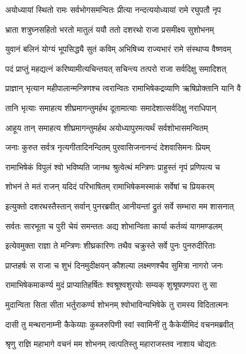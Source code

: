 \twolineshloka
{अयोध्यायां स्थितो रामः सर्वभोगसमन्वितः}
{प्रीत्या नन्दत्ययोध्यायां रामे रघुपतौ नृप} %

\twolineshloka
{भ्राता शत्रुघ्नसहितो भरतो मातुलं ययौ}
{ततो दशरथो राजा प्रसमीक्ष्य सुशोभनम्} %

\twolineshloka
{युवानं बलिनं योग्यं भूपसिद्ध्यै सुतं कविम्}
{अभिषिच्य राज्यभारं रामे संस्थाप्य वैष्णवम्} %

\twolineshloka
{पदं प्राप्तुं महद्यत्नं करिष्यामीत्यचिन्तयत्}
{सचिन्त्य तत्परो राजा सर्वदिक्षु समादिशत्} %

\twolineshloka
{प्राज्ञान् भृत्यान महीपालान्मन्त्रिणश्च त्वरान्वितः}
{रामाभिषेकद्रव्याणि ऋषिप्रोक्तानि यानि वै} %

\twolineshloka
{तानि भृत्याः समाहत्य शीघ्रमागन्तुमर्हथ}
{दूतामात्याः समादेशात्सर्वदिक्षु नराधिपान्} %

\twolineshloka
{आहूय तान् समाहत्य शीघ्रमागन्तुमर्हथ}
{अयोध्यापुरमत्यर्थं सर्वशोभासमन्वितम्} %

\twolineshloka
{जनाः कुरुत सर्वत्र नृत्यगीतादिनन्दितम्}
{पुरवासिजनानन्दं देशवासिमनः प्रियम्} %

\twolineshloka
{रामाभिषेकं विपुलं श्वो भविष्यति जानथ}
{श्रुत्वेत्थं मन्त्रिणः प्राहुस्तं नृपं प्रणिपत्य च} %

\twolineshloka
{शोभनं ते मतं राजन् यदिदं परिभाषितम्}
{रामाभिषेकमस्माकं सर्वेषां च प्रियकरम्} %

\twolineshloka
{इत्युक्तो दशरथस्तैस्तान् सर्वान् पुनरब्रवीत्}
{आनीयन्तां द्रुतं सर्वे सम्भारा मम शासनात्} %

\twolineshloka
{सर्वतः सारभूता च पुरी चेयं समन्ततः}
{अद्य शोभान्विता कार्या कर्तव्यं यागमण्डलम्} %

\twolineshloka
{इत्येवमुक्ता राज्ञा ते मन्त्रिणः शीघ्रकारिणः}
{तथैव चक्रुस्ते सर्वे पुनः पुनरुदीरिताः} %

\twolineshloka
{प्राप्तहर्षः स राजा च शुभं दिनमुदीक्षयन्}
{कौशल्या लक्ष्मणश्चैव सुमित्रा नागरो जनः} %

\twolineshloka
{रामाभिषेकमाकर्ण्य मुदं प्राप्यातिहर्षितः}
{श्वश्रूश्वशुरयोः सम्यक् शुश्रूषपणपरा तु सा} %

\twolineshloka
{मुदान्विता सिता सीता भर्तुराकर्ण्य शोभनम्}
{श्वोभाविन्यभिषेके तु रामस्य विदितात्मनः} %

\twolineshloka
{दासी तु मन्थरानाम्नी कैकेय्याः कुब्जरुपिणी}
{स्वां स्वामिनीं तु कैकेयीमिदं वचनमब्रवीत्} %

\twolineshloka
{श्रृणु राज्ञि महाभागे वचनं मम शोभनम्}
{त्वत्पतिस्तु महाराजस्तव नाशाय चोद्यतः} %

